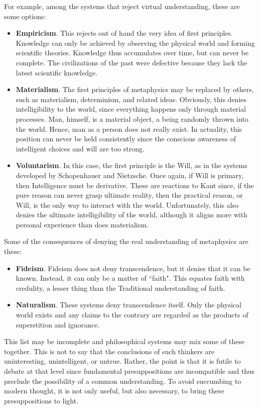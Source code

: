 For example, among the systems that reject virtual understanding, these are some options:

\begin{itemize}
\item \textbf{Empiricism}. This rejects out of hand the very idea of first principles. Knowledge can only be achieved by observing the physical world and forming scientific theories. Knowledge thus accumulates over time, but can never be complete. The civilizations of the past were defective because they lack the latest scientific knowledge. 
\item \textbf{Materialism}. The first principles of metaphysics may be replaced by others, such as materialism, determinism, and related ideas. Obviously, this denies intelligibility to the world, since everything happens only through material processes. Man, himself, is a material object, a being randomly thrown into the world. Hence, man as a person does not really exist. In actuality, this position can never be held consistently since the conscious awareness of intelligent choices and will are too strong. 
\item \textbf{Voluntarism}. In this case, the first principle is the Will, as in the systems developed by Schopenhauer and Nietzsche. Once again, if Will is primary, then Intelligence must be derivative. These are reactions to Kant since, if the pure reason can never grasp ultimate reality, then the practical reason, or Will, is the only way to interact with the world. Unfortunately, this also denies the ultimate intelligibility of the world, although it aligns more with personal experience than does materialism. 
\end{itemize}
Some of the consequences of denying the real understanding of metaphysics are these:

\begin{itemize}
\item \textbf{Fideism}. Fideism does not deny transcendence, but it denies that it can be known. Instead, it can only be a matter of ``faith". This equates faith with credulity, a lesser thing than the Traditional understanding of faith. 
\item \textbf{Naturalism}. These systems deny transcendence itself. Only the physical world exists and any claims to the contrary are regarded as the products of superstition and ignorance. 
\end{itemize}
This list may be incomplete and philosophical systems may mix some of these together. This is not to say that the conclusions of such thinkers are uninteresting, unintelligent, or untrue. Rather, the point is that it is futile to debate at that level since fundamental presuppositions are incompatible and thus preclude the possibility of a common understanding. To avoid succumbing to modern thought, it is not only useful, but also necessary, to bring these presuppositions to light.



